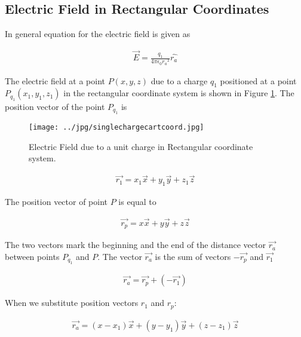 \subsection{Electric Field in Rectangular Coordinates}


In general equation for the electric field is given as



\begin{eqnarray}
\vec{E}=\frac{q_1}{4 \pi \epsilon_{0} {r_a}^2} \hat{r_a} \label{genfield}
\end{eqnarray}

The electric field at a point $P(x,y,z)$ due to a charge $q_1$ positioned at a point $P_{q_1}(x_1, y_1, z_1 )$  in the rectangular coordinate system is shown in Figure \ref{singlecharge}. The position vector of the point $P_{q_1}$  is 


\begin{figure}[htbp]
\begin{center}
\texttt{[image: ../jpg/singlechargecartcoord.jpg]}
\end{center}
\caption{Electric Field due to a unit charge in Rectangular coordinate system.}
\label{singlecharge}
\end{figure}





\begin{eqnarray}
\vec{r_1}=x_1 \vec{x} + y_1 \vec{y} +z_1 \vec{z}
\end{eqnarray}

The position vector of point $P$ is equal to

\begin{eqnarray}
\vec{r_p}=x\vec{x} + y \vec{y} +z \vec{z}
\end{eqnarray}

The two vectors mark the beginning and the end of the distance vector $\vec{r_a}$  between points $P_{q_1}$ and $P$. The vector  $\vec{r_a}$ is the sum of vectors $-\vec{r_p}$ and $\vec{r_1}$



\begin{eqnarray}
\vec{r_a}=\vec{r_p} + (-\vec{r_1})
\end{eqnarray}

When we substitute position vectors $r_1$ and $r_p$:

\begin{eqnarray}
\vec{r_a}= (x - x_1) \vec{x} +(y - y_1) \vec{y} +(z - z_1) \vec{z}
\end{eqnarray}

